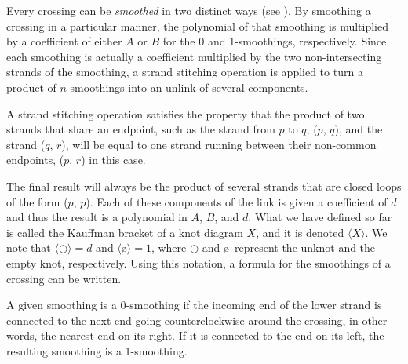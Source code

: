 \begin{paper}
Every crossing can be \textit{smoothed} in two distinct ways (see
\figSmoothings).
By smoothing a crossing in a particular manner, the polynomial of that smoothing
is multiplied by a coefficient of either $A$ or $B$ for the 0 and 1-smoothings,
respectively.
Since each smoothing is actually a coefficient multiplied by the two
non-intersecting strands of the smoothing, a strand stitching operation is
applied to turn a product of $n$ smoothings into an unlink of several
components.

A strand stitching operation satisfies the property that the product of two
strands that share an endpoint, such as the strand from $p$ to $q$, ($p$, $q$),
and the strand ($q$, $r$), will be equal to one strand running between their
non-common endpoints, ($p$, $r$) in this case.

The final result will always be the product of several strands that are closed
loops of the form ($p$, $p$).
Each of these components of the link is given a coefficient of $d$ and thus the
result is a polynomial in $A$, $B$, and $d$.
What we have defined so far is called the Kauffman bracket of a knot diagram
$X$, and it is denoted $\langle X\rangle$.
We note that $\langle\bigcirc\rangle=d$ and $\langle$\o$\rangle=1$, where
$\bigcirc$ and \o~represent the unknot and the empty knot, respectively.
Using this notation, a formula for the smoothings of a crossing can be written.


A given smoothing is a 0-smoothing if the incoming end of the lower strand is
connected to the next end going counterclockwise around the crossing, in other
words, the nearest end on its right.
If it is connected to the end on its left, the resulting smoothing is a
1-smoothing.


\end{paper}

